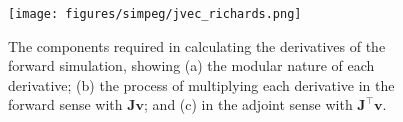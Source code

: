 \begin{figure}[!htbp]
\begin{center}
\texttt{[image: figures/simpeg/jvec\_richards.png]}
\end{center}
\caption{
The components required in calculating the derivatives of the forward simulation, showing (a) the modular nature of each derivative; (b) the process of multiplying each derivative in the forward sense with $\mathbf{J}\mathbf{v}$; and (c) in the adjoint sense with $\mathbf{J}^\top \mathbf{v}$.
}
\label{fig:simpeg-jvec_richards}
\end{figure}
